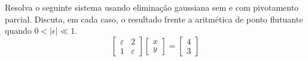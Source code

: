 \begin{ex} Resolva o seguinte sistema usando eliminação gaussiana sem e com pivotamento parcial. Discuta, em cada caso, o resultado frente a aritmética de ponto flutuante quando $0<|\epsilon| \ll 1$.
  \begin{equation*}
    \begin{bmatrix}
      \varepsilon & 2\\
      1 & \varepsilon
    \end{bmatrix}
    \begin{bmatrix}
      x\\y
    \end{bmatrix}
    =
    \begin{bmatrix}
      4\\3
    \end{bmatrix}
  \end{equation*}
\end{ex}
